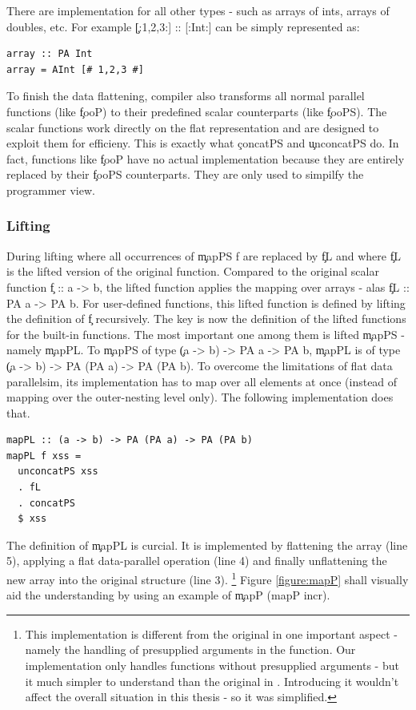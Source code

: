       
      There are implementation for all other types - such as arrays of ints,
      arrays of doubles, etc. For example \c{[:1,2,3:] :: [:Int:]} can be simply
      represented as:
      \begin{lstlisting}
array :: PA Int
array = AInt [# 1,2,3 #]
      \end{lstlisting}
      
      To finish the data flattening, compiler also transforms
      all normal parallel functions (like \c{fooP}) to
      their predefined scalar counterparts (like \c{fooPS}).
      The scalar functions work directly on the flat representation
      and are designed to exploit them for efficieny.
      This is exactly what \c{concatPS} and \c{unconcatPS} do.
      In fact, functions like \c{fooP} have no actual implementation
      because they are entirely replaced by their \c{fooPS} counterparts.
      They are only used to simpilfy the programmer view.
    
      
    \subsubsection{Lifting}
      During lifting where all occurrences of \c{mapPS f} are
      replaced by \c{fL} and where \c{fL}
      is the lifted version of the original function.
      Compared to the original scalar function \c{f :: a -> b}, the lifted
      function applies the mapping over arrays - alas \c{fL :: PA a -> PA b}.
      For user-defined functions, this lifted function is defined
      by lifting the definition of \c{f} recursively.
      The key is now the definition of the lifted functions for the built-in functions.
      The most important one among them is lifted \c{mapPS} - namely \c{mapPL}.
      To \c{mapPS} of type \c{(a -> b) -> PA a -> PA b},
      \c{mapPL} is of type \c{(a -> b) -> PA (PA a) -> PA (PA b)}.
      To overcome the limitations of flat data parallelsim,
      its implementation has to map over all elements at once
      (instead of mapping over the outer-nesting level only).
      The following implementation does that.
    \begin{lstlisting}
mapPL :: (a -> b) -> PA (PA a) -> PA (PA b)
mapPL f xss =
  unconcatPS xss
  . fL
  . concatPS
  $ xss
    \end{lstlisting}
    The definition of \c{mapPL} is curcial. It is implemented by flattening the array (line 5), applying a flat data-parallel operation (line 4)
    and finally unflattening the new array into the original structure (line 3).
    \footnote{This implementation is different from the original in one important aspect - 
    namely the handling of presupplied arguments in the function. Our
    implementation only handles functions without presupplied arguments -
    but it much simpler to understand than the original in \cite{Harness2008}.
    Introducing it wouldn't affect the overall situation in this thesis -
    so it was simplified.
    }
    Figure \ref{figure:mapP} shall visually aid the understanding by using
    an example of \c{mapP (mapP incr)}.
    

